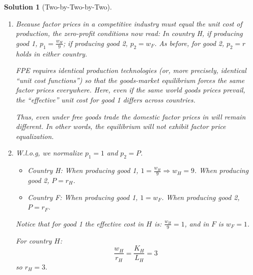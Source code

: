 \documentclass[a4paper,12pt]{article} %
\theoremstyle{nonitalic}
\newtheorem{solution}{Solution}
\begin{document}
\begin{solution}[Two-by-Two-by-Two]
\begin{enumerate}
        \item[4.] Because factor prices in a competitive industry must equal the unit cost of production, the zero-profit conditions now read:
        In country H, if producing good 1, $p_1 = \frac{w_H}{9}$; if producing good 2, $p_2 = w_F$. As before, for good 2, $p_2 = r$ holds in either country.
        
        FPE requires identical production technologies (or, more precisely, identical “unit cost functions”) 
        so that the goods-market equilibrium forces the same factor prices everywhere. Here, even if the same world goods prices prevail, 
        the “effective” unit cost for good 1 differs across countries.

        Thus, even under free goods trade the domestic factor prices in will remain different. 
        In other words, the equilibrium will not exhibit factor price equalization.

        \item[5.] W.l.o.g, we normalize $p_1 =1$ and $p_2 = P$.
            \begin{itemize}
                \item Country H: When producing good 1, $1 = \frac{w_H}{9} \Rightarrow w_H = 9$.
                    When producing good 2, $P = r_H$.
                \item Country F: When producing good 1, $1 = w_F$.
                    When producing good 2, $P = r_F$.
            \end{itemize}
            Notice that for good 1 the effective cost in $H$ is: $\frac{w_H}{9} = 1$, and in $F$ is $w_F = 1$.
            
            For country $H$:
            \[\frac{w_H}{r_H} = \frac{K_H}{L_H} = 3\]
            so $r_H = 3.$


\end{enumerate}
\end{solution}
\end{document}
